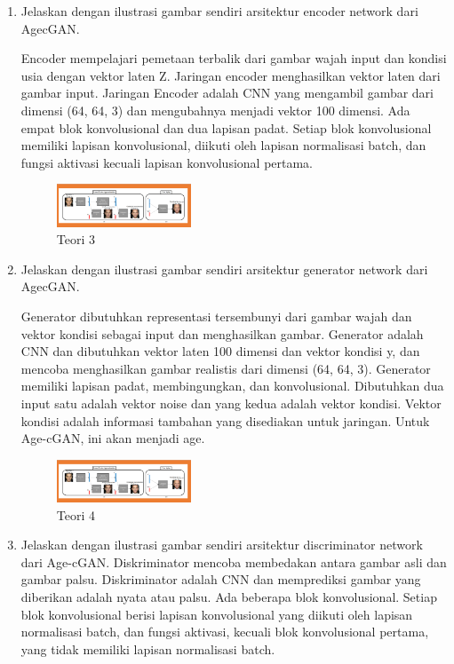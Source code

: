 \begin{enumerate}
	\item Jelaskan dengan ilustrasi gambar sendiri arsitektur encoder network dari AgecGAN.

	\hfill\break
	Encoder mempelajari pemetaan terbalik dari gambar wajah input dan kondisi usia dengan vektor laten Z. Jaringan encoder menghasilkan vektor laten dari gambar input. Jaringan Encoder adalah CNN yang mengambil gambar dari dimensi (64, 64, 3) dan mengubahnya menjadi vektor 100 dimensi. Ada empat blok konvolusional dan dua lapisan padat. Setiap blok konvolusional memiliki lapisan konvolusional, diikuti oleh lapisan normalisasi batch, dan fungsi aktivasi kecuali lapisan konvolusional pertama.

	\begin{figure}[H]
	\centering
		\includegraphics[width=4cm]{figures/1174005/tugas9/materi/teori345.PNG}
		\caption{Teori 3}
	\end{figure}

	\item Jelaskan dengan ilustrasi gambar sendiri arsitektur generator network dari AgecGAN.

	\hfill\break
	Generator dibutuhkan representasi tersembunyi dari gambar wajah dan vektor kondisi sebagai input dan menghasilkan gambar. Generator adalah CNN dan dibutuhkan vektor laten 100 dimensi dan vektor kondisi y, dan mencoba menghasilkan gambar realistis dari dimensi (64, 64, 3). Generator memiliki lapisan padat, membingungkan, dan konvolusional. Dibutuhkan dua input satu adalah vektor noise dan yang kedua adalah vektor kondisi. Vektor kondisi adalah informasi tambahan yang disediakan untuk jaringan. Untuk Age-cGAN, ini akan menjadi age.

	\begin{figure}[H]
	\centering
		\includegraphics[width=4cm]{figures/1174005/tugas9/materi/teori345.PNG}
		\caption{Teori 4}
	\end{figure}

	\item Jelaskan dengan ilustrasi gambar sendiri arsitektur discriminator network dari Age-cGAN.
	\hfill\break
	Diskriminator mencoba membedakan antara gambar asli dan gambar palsu. Diskriminator adalah CNN dan memprediksi gambar yang diberikan adalah nyata atau palsu. Ada beberapa blok konvolusional. Setiap blok konvolusional berisi lapisan konvolusional yang diikuti oleh lapisan normalisasi batch, dan fungsi aktivasi, kecuali blok konvolusional pertama, yang tidak memiliki lapisan normalisasi batch.


\end{enumerate}
